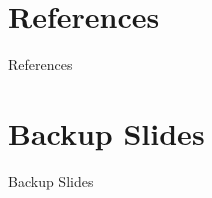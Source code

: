 \documentclass[aspectratio=169]{beamer}                    %
\begin{document}
\section{References}
\begin{frame}{References}
	\printbibliography
\end{frame}

\appendix %
\section*{Backup Slides}
\begin{frame}
	\centering
	\vfill
	{\fontsize{40}{50}\selectfont Backup Slides}
	\vfill
\end{frame}
\end{document}
